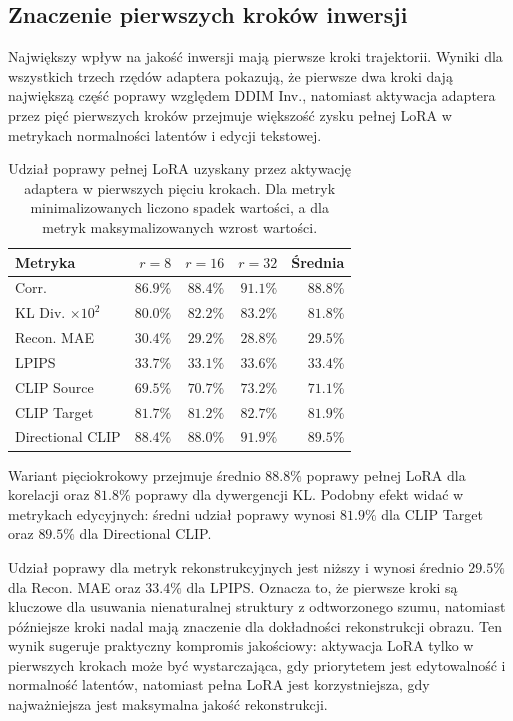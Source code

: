 \documentclass[
    left=2.5cm,
    right=2.5cm,
    top=2.5cm,
    bottom=3cm,
    bindingoffset=6mm,
    nohyphenation=false
]{szablon/eiti/sprawozdanie}
\begin{document}
\subsection{Znaczenie pierwszych kroków inwersji}

Największy wpływ na jakość inwersji mają pierwsze kroki trajektorii.
Wyniki dla wszystkich trzech rzędów adaptera pokazują, że pierwsze dwa
kroki dają największą część poprawy względem DDIM Inv., natomiast aktywacja
adaptera przez pięć pierwszych kroków przejmuje większość zysku pełnej LoRA
w metrykach normalności latentów i edycji tekstowej.

\begin{table}[H]
    \centering
    \caption{Udział poprawy pełnej LoRA uzyskany przez aktywację adaptera
    w pierwszych pięciu krokach. Dla metryk minimalizowanych liczono spadek
    wartości, a dla metryk maksymalizowanych wzrost wartości.}
    \label{tab:first-steps-share}
    \begin{tabular}{lrrrr}
        \toprule
        Metryka &
        $r=8$ &
        $r=16$ &
        $r=32$ &
        Średnia \\
        \midrule
        Corr. & $86.9\%$ & $88.4\%$ & $91.1\%$ & $88.8\%$ \\
        KL Div. $\times 10^2$ & $80.0\%$ & $82.2\%$ & $83.2\%$ & $81.8\%$ \\
        Recon. MAE & $30.4\%$ & $29.2\%$ & $28.8\%$ & $29.5\%$ \\
        LPIPS & $33.7\%$ & $33.1\%$ & $33.6\%$ & $33.4\%$ \\
        CLIP Source & $69.5\%$ & $70.7\%$ & $73.2\%$ & $71.1\%$ \\
        CLIP Target & $81.7\%$ & $81.2\%$ & $82.7\%$ & $81.9\%$ \\
        Directional CLIP & $88.4\%$ & $88.0\%$ & $91.9\%$ & $89.5\%$ \\
        \bottomrule
    \end{tabular}
\end{table}

Wariant pięciokrokowy przejmuje średnio $88.8\%$ poprawy pełnej LoRA dla
korelacji oraz $81.8\%$ poprawy dla dywergencji KL. Podobny efekt widać w
metrykach edycyjnych: średni udział poprawy wynosi $81.9\%$ dla CLIP\cite{DBLP:journals/corr/abs-2103-00020} Target
oraz $89.5\%$ dla Directional CLIP\cite{DBLP:journals/corr/abs-2108-00946}.

Udział poprawy dla metryk rekonstrukcyjnych jest niższy i wynosi średnio
$29.5\%$ dla Recon. MAE oraz $33.4\%$ dla LPIPS. Oznacza to, że pierwsze
kroki są kluczowe dla usuwania nienaturalnej struktury z odtworzonego szumu,
natomiast późniejsze kroki nadal mają znaczenie dla dokładności
rekonstrukcji obrazu. Ten wynik sugeruje praktyczny kompromis jakościowy:
aktywacja LoRA tylko w pierwszych krokach może być wystarczająca, gdy
priorytetem jest edytowalność i normalność latentów, natomiast pełna LoRA
jest korzystniejsza, gdy najważniejsza jest maksymalna jakość rekonstrukcji.
\end{document}
